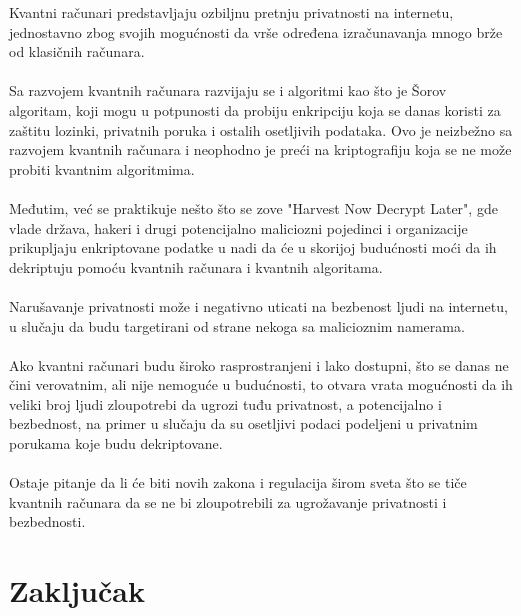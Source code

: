 \documentclass[fleqn, 12pt]{article}
\begin{document}
\begin{text}
Kvantni računari predstavljaju ozbiljnu pretnju privatnosti na internetu, jednostavno zbog svojih mogućnosti da vrše određena izračunavanja mnogo brže od klasičnih računara.
\\\\

Sa razvojem kvantnih računara razvijaju se i algoritmi kao što je Šorov algoritam, koji mogu u potpunosti da probiju enkripciju koja se danas koristi za zaštitu lozinki, privatnih poruka i ostalih osetljivih podataka. Ovo je neizbežno sa razvojem kvantnih računara i neophodno je preći na kriptografiju koja se ne može probiti kvantnim algoritmima.
\\\\

Međutim, već se praktikuje nešto što se zove "Harvest Now Decrypt Later", gde vlade država, hakeri i drugi potencijalno maliciozni pojedinci i organizacije prikupljaju enkriptovane podatke u nadi da će u skorijoj budućnosti moći da ih dekriptuju pomoću kvantnih računara i kvantnih algoritama.
\\\\

Narušavanje privatnosti može i negativno uticati na bezbenost ljudi na internetu, u slučaju da budu targetirani od strane nekoga sa malicioznim namerama.
\\\\

Ako kvantni računari budu široko rasprostranjeni i lako dostupni, što se danas ne čini verovatnim, ali nije nemoguće u budućnosti, to otvara vrata mogućnosti da ih veliki broj ljudi zloupotrebi da ugrozi tuđu privatnost, a potencijalno i bezbednost, na primer u slučaju da su osetljivi podaci podeljeni u privatnim porukama koje budu dekriptovane.
\\\\

Ostaje pitanje da li će biti novih zakona i regulacija širom sveta što se tiče kvantnih računara da se ne bi zloupotrebili za ugrožavanje privatnosti i bezbednosti.
\end{text}

\newpage

\section{Zaključak}
\end{document}
